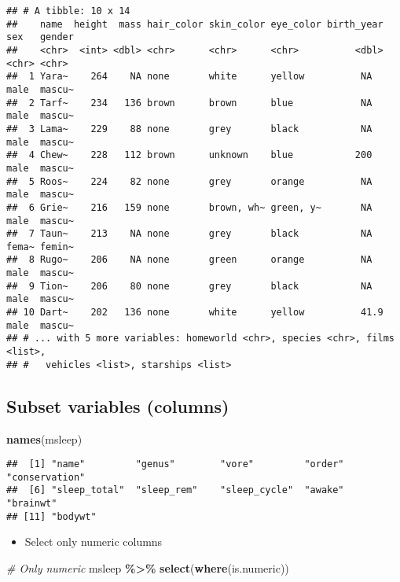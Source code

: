 \documentclass[
]{book}
\newenvironment{Shaded}{\begin{snugshade}}{\end{snugshade}}
\newcommand{\CommentTok}[1]{\textcolor[rgb]{0.56,0.35,0.01}{\textit{#1}}}
\newcommand{\KeywordTok}[1]{\textcolor[rgb]{0.13,0.29,0.53}{\textbf{#1}}}
\newcommand{\NormalTok}[1]{#1}
\newcommand{\OperatorTok}[1]{\textcolor[rgb]{0.81,0.36,0.00}{\textbf{#1}}}
\newcommand{\StringTok}[1]{\textcolor[rgb]{0.31,0.60,0.02}{#1}}
\providecommand{\tightlist}{%
  \setlength{\itemsep}{0pt}\setlength{\parskip}{0pt}}
\begin{document}
\begin{verbatim}
## # A tibble: 10 x 14
##    name  height  mass hair_color skin_color eye_color birth_year sex   gender
##    <chr>  <int> <dbl> <chr>      <chr>      <chr>          <dbl> <chr> <chr> 
##  1 Yara~    264    NA none       white      yellow          NA   male  mascu~
##  2 Tarf~    234   136 brown      brown      blue            NA   male  mascu~
##  3 Lama~    229    88 none       grey       black           NA   male  mascu~
##  4 Chew~    228   112 brown      unknown    blue           200   male  mascu~
##  5 Roos~    224    82 none       grey       orange          NA   male  mascu~
##  6 Grie~    216   159 none       brown, wh~ green, y~       NA   male  mascu~
##  7 Taun~    213    NA none       grey       black           NA   fema~ femin~
##  8 Rugo~    206    NA none       green      orange          NA   male  mascu~
##  9 Tion~    206    80 none       grey       black           NA   male  mascu~
## 10 Dart~    202   136 none       white      yellow          41.9 male  mascu~
## # ... with 5 more variables: homeworld <chr>, species <chr>, films <list>,
## #   vehicles <list>, starships <list>
\end{verbatim}

\hypertarget{subset-variables-columns}{%
\subsection{Subset variables (columns)}\label{subset-variables-columns}}

\begin{Shaded}
\begin{Highlighting}[]
\KeywordTok{names}\NormalTok{(msleep)}
\end{Highlighting}
\end{Shaded}

\begin{verbatim}
##  [1] "name"         "genus"        "vore"         "order"        "conservation"
##  [6] "sleep_total"  "sleep_rem"    "sleep_cycle"  "awake"        "brainwt"     
## [11] "bodywt"
\end{verbatim}

\begin{itemize}
\tightlist
\item
  Select only numeric columns
\end{itemize}

\begin{Shaded}
\begin{Highlighting}[]
\CommentTok{\# Only numeric}
\NormalTok{msleep }\OperatorTok{\%\textgreater{}\%}
\StringTok{  }\KeywordTok{select}\NormalTok{(}\KeywordTok{where}\NormalTok{(is.numeric))}
\end{Highlighting}
\end{Shaded}
\end{document}
